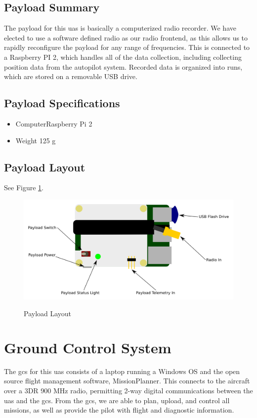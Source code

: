 \documentclass{report}
\begin{document}
		\subsection{Payload Summary}
			The payload for this \gls{uas} is basically a computerized radio recorder.  We have elected to use a software defined radio as our radio frontend, as this allows us to rapidly reconfigure the payload for any range of frequencies.  This is connected to a Raspberry PI 2, which handles all of the data collection, including collecting position data from the autopilot system.  Recorded data is organized into runs, which are stored on a removable USB drive.
		\subsection{Payload Specifications}
			\begin{itemize}
				\item Computer\hfill Raspberry Pi 2
				\item Weight \hfill 125 g
			\end{itemize}
		\subsection{Payload Layout}
			See Figure \ref{fig:payload_layout}.
			\begin{figure}[ht]
				\centering
				\caption{Payload Layout}
				\includegraphics[width=\textwidth]{payload_layout.png}
				\label{fig:payload_layout}
			\end{figure}
	\section{Ground Control System}
		The \gls{gcs} for this \gls{uas} consists of a laptop running a Windows OS and the open source flight management software, MissionPlanner.  This connects to the aircraft over a 3DR 900 MHz radio, permitting 2-way digital communications between the \gls{uas} and the \gls{gcs}.  From the \gls{gcs}, we are able to plan, upload, and control all missions, as well as provide the pilot with flight and diagnostic information.
\end{document}
